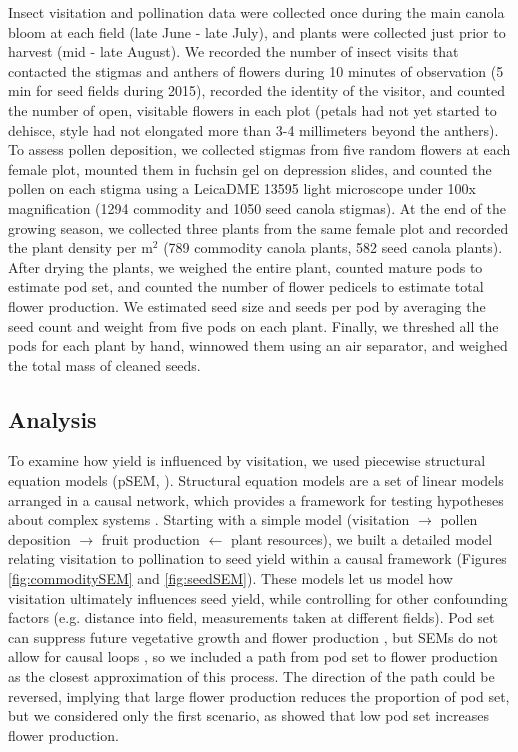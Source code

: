 \documentclass[12pt]{article} %
\begin{document}
Insect visitation and pollination data were collected once during the main canola bloom at each field (late June - late July), and plants were collected just prior to harvest (mid - late August).
We recorded the number of insect visits that contacted the stigmas and anthers of flowers during 10 minutes of observation (5 min for seed fields during 2015), recorded the identity of the visitor, and counted the number of open, visitable flowers in each plot (petals had not yet started to dehisce, style had not elongated more than 3-4 millimeters beyond the anthers).
To assess pollen deposition, we collected stigmas from five random flowers at each female plot, mounted them in fuchsin gel \citep{beattie1971} on depression slides, and counted the pollen on each stigma using a Leica\texttrademark DME 13595 light microscope under 100x magnification (1294 commodity and 1050 seed canola stigmas).
At the end of the growing season, we collected three plants from the same female plot and recorded the plant density per m$^2$ (789 commodity canola plants, 582 seed canola plants).
After drying the plants, we weighed the entire plant, counted mature pods to estimate pod set, and counted the number of flower pedicels to estimate total flower production. %
We estimated seed size and seeds per pod by averaging the seed count and weight from five pods on each plant.
Finally, we threshed all the pods for each plant by hand, winnowed them using an air separator, and weighed the total mass of cleaned seeds. %

\subsection{Analysis}
To examine how yield is influenced by visitation, we used piecewise structural equation models (pSEM, \citealp{shipley2009}).
Structural equation models are a set of linear models arranged in a causal network, which provides a framework for testing hypotheses about complex systems \citep{grace2012, lefcheck2015}.
Starting with a simple model (visitation $\rightarrow$ pollen deposition $\rightarrow$ fruit production $\leftarrow$ plant resources), we built a detailed model relating visitation to pollination to seed yield within a causal framework (Figures \ref{fig:commoditySEM} and \ref{fig:seedSEM}).
These models let us model how visitation ultimately influences seed yield, while controlling for other confounding factors (e.g. distance into field, measurements taken at different fields).
Pod set can suppress future vegetative growth and flower production \citep{stephenson1981}, but SEMs do not allow for causal loops \citep{grace2012}, so we included a path from pod set to flower production as the closest approximation of this process.
The direction of the path could be reversed, implying that large flower production reduces the proportion of pod set, but we considered only the first scenario, as \citet{sabbahi2006} showed that low pod set increases flower production.
\end{document}
